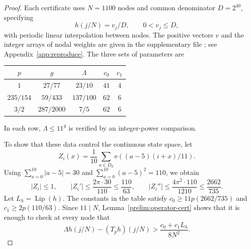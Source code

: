 \documentclass[11pt,a4paper]{article}
\theoremstyle{paperplain}
\numberwithin{equation}{section}
\begin{document}
\begin{proof}
Each certificate uses $N=1100$ nodes and common denominator $D=2^{40}$,
specifying
\[
 h(j/N)=v_j/D,\qquad 0<v_j\leqslant D,
\]
with periodic linear interpolation between nodes. The positive vectors
$v$ and the integer arrays of nodal weights are given in the
supplementary file ;
see Appendix~\ref{app:reproduce}. The three sets of parameters are
\begin{center}
\begin{tabular}{ccccc}
\toprule
$p$ & $g$ & $\Lambda$ & $c_0$ & $c_1$\\
\midrule
$1$ & $27/77$ & $23/10$ & $41$ & $4$\\
$235/154$ & $59/433$ & $137/100$ & $62$ & $6$\\
$3/2$ & $287/2000$ & $7/5$ & $62$ & $6$\\
\bottomrule
\end{tabular}
\end{center}
In each row, $\Lambda\leqslant11^g$ is verified by an integer-power
comparison.

To show that these data control the continuous state space, let
\[
 Z_i(x)=\frac1{10}\sum_{a\in D_d}
          \mathrm e((a-5)(i+x)/11).
\]
Using $\sum_{a=0}^{10}|a-5|=30$ and
$\sum_{a=0}^{10}(a-5)^2=110$, we obtain
\[
 |Z_i|\leqslant1,\qquad
 |Z_i'|\leqslant\frac{2\pi\cdot30}{110}\leqslant\frac{110}{63},
 \qquad
 |Z_i''|\leqslant\frac{4\pi^2\cdot110}{1210}
       \leqslant\frac{2662}{735}.
\]
Let $L_h=\operatorname{Lip}(h)$. The constants in the table satisfy
$c_0\geqslant11p(2662/735)$ and $c_1\geqslant2p(110/63)$.
Since $11\mid N$, Lemma~\ref{prelim:operator-cert} shows that it is enough
to check at every node that
\begin{equation}\label{eleven:node}
 \Lambda h(j/N)-(T_ph)(j/N)
 >\frac{c_0+c_1L_h}{8N^2}.
\end{equation}


\end{proof}
\end{document}
